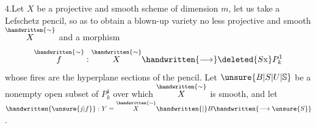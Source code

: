 4.\quad Let $X$ be a projective and smooth scheme of dimension $m$, let us take a Lefschetz pencil, so as to obtain a blown-up variety no less projective and smooth $\overset{\handwritten{\sim}}{X}$ and a morphism
\[
\overset{\handwritten{\sim}}{f}:\overset{\handwritten{\sim}}{X}\handwritten{\longrightarrow}\deleted{S\mathrm{x}}P^1_k
\]
whose fires are the hyperplane sections of the pencil. Let $\unsure{B|S|U|\mathbb{S}}$ be a nonempty open subset of $P^1_k$ over which $\overset{\handwritten{\sim}}{X}$ is smooth, and let $\handwritten{\unsure{j|f}}:Y=\overset{\handwritten{\sim}}{X}\handwritten{|}B\handwritten{\longrightarrow\unsure{S}}$.
